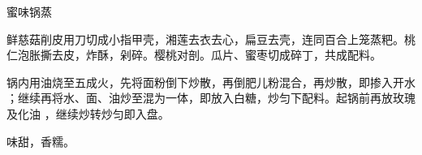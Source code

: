 \begin{recipe}[八宝锅蒸]{蜜味锅蒸}

\ingredients


\cooking

\step 鲜慈菇削皮用刀切成小指甲壳，湘莲去衣去心，扁豆去壳，连同百合上笼蒸粑。桃
仁泡胀撕去皮，炸酥，剁碎。樱桃对剖。瓜片、蜜枣切成碎丁，共成配料。

\step 锅内用油烧至五成火，先将面粉倒下炒散，再倒肥儿粉混合，再炒散，即掺入开水
；继续再将水、面、油炒至混为一体，即放入白糖，炒匀下配料。起锅前再放玫瑰及化油
，继续炒转炒匀即入盘。

\notes

味甜，香糯。

\end{recipe}

